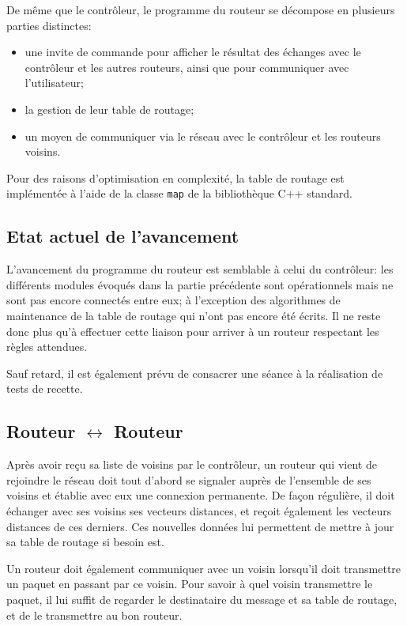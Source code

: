 \documentclass[a4paper,11pt]{article}
\begin{document}
De même que le contrôleur, le programme du routeur se décompose en plusieurs parties distinctes:
\begin{itemize}
\item une invite de commande pour afficher le résultat des échanges avec le contrôleur et les autres routeurs, ainsi que pour communiquer avec l'utilisateur;
\item la gestion de leur table de routage;
\item un moyen de communiquer via le réseau avec le contrôleur et les routeurs voisins.
\end{itemize}

Pour des raisons d'optimisation en complexité, la table de routage est implémentée à l'aide de la classe \texttt{map} de la bibliothèque C++ standard.

\subsection{Etat actuel de l'avancement}

L'avancement du programme du routeur est semblable à celui du contrôleur: les différents modules évoqués dans la partie précédente sont opérationnels mais ne sont pas encore connectés entre eux; à l'exception des algorithmes de maintenance de la table de routage qui n'ont pas encore été écrits. Il ne reste donc plus qu'à effectuer cette liaison pour arriver à un routeur respectant les règles attendues.

Sauf retard, il est également prévu de consacrer une séance à la réalisation de tests de recette.

\subsection{Routeur $\leftrightarrow$ Routeur}

Après avoir reçu sa liste de voisins par le contrôleur, un routeur qui vient de rejoindre le réseau doit tout d'abord se signaler auprès de l'ensemble de ses voisins et établie avec eux une connexion permanente. De façon régulière, il doit échanger avec ses voisins ses vecteurs distances, et reçoit également les vecteurs distances de ces derniers. Ces nouvelles données lui permettent de mettre à jour sa table de routage si besoin est.

Un routeur doit également communiquer avec un voisin lorsqu'il doit transmettre un paquet en passant par ce voisin. Pour savoir à quel voisin transmettre le paquet, il lui suffit de regarder le destinataire du message et sa table de routage, et de le transmettre au bon routeur.
\end{document}
